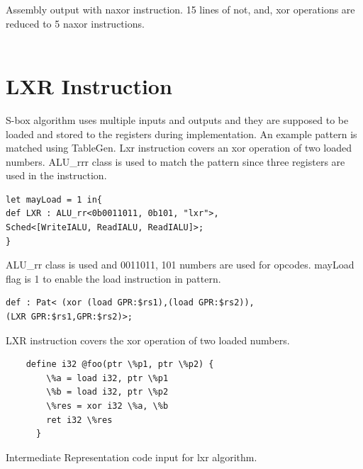 Assembly output with naxor instruction. 15 lines of not, and, xor operations are reduced to 5 naxor instructions.
\\\\






\section{LXR Instruction}

S-box algorithm uses multiple inputs and outputs and they are supposed to be loaded and stored to the registers during implementation. An example pattern is matched using TableGen. Lxr instruction covers an xor operation of two loaded numbers. ALU\_rrr class is used to match the pattern since three registers are used in the instruction.

\begin{lstlisting}
let mayLoad = 1 in{
def LXR : ALU_rr<0b0011011, 0b101, "lxr">,
Sched<[WriteIALU, ReadIALU, ReadIALU]>;
}
\end{lstlisting}

ALU\_rr class is used and 0011011, 101 numbers are used for opcodes. mayLoad flag is 1 to enable the load instruction in pattern.
\\
\begin{lstlisting}
def : Pat< (xor (load GPR:$rs1),(load GPR:$rs2)),
(LXR GPR:$rs1,GPR:$rs2)>;
\end{lstlisting}

LXR instruction covers the xor operation of two loaded numbers.
\\


\begin{lstlisting}
    define i32 @foo(ptr \%p1, ptr \%p2) {
        \%a = load i32, ptr \%p1
        \%b = load i32, ptr \%p2
        \%res = xor i32 \%a, \%b
        ret i32 \%res
      }
\end{lstlisting}

Intermediate Representation code input for lxr algorithm.
\\\\

